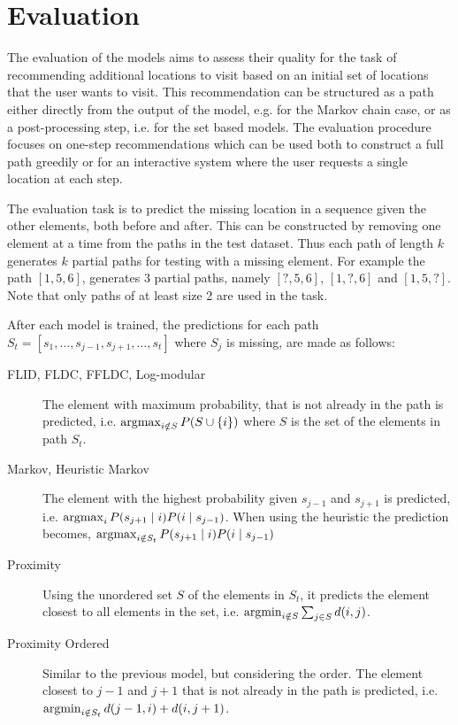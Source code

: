 \section{Evaluation}
\label{sec:evaluation}

The evaluation of the models aims to assess their quality for the task of recommending additional locations to visit based on an initial set of locations that the user wants to visit. This recommendation can be structured as a path either directly from the output of the model, e.g. for the Markov chain case, or as a post-processing step, i.e. for the set based models. The evaluation procedure focuses on one-step recommendations which can be used both to construct a full path greedily or for an interactive system where the user requests a single location at each step.

The evaluation task is to predict the missing location in a sequence given the other elements, both before and after. This can be constructed by removing one element at a time from the paths in the test dataset. Thus each path of length $k$ generates $k$ partial paths for testing with a missing element. For example the path $[1,5,6]$, generates 3 partial paths, namely $[?,5,6]$, $[1,?,6]$ and $[1,5,?]$. Note that only paths of at least size 2 are used in the task.

After each model is trained, the predictions for each path $S_{t} = [s_{1}, \dots, s_{j-1}, s_{j+1}, \dots, s_{t}]$ where $S_{j}$ is missing, are made as follows:

\begin{description}
  \item[FLID, FLDC, FFLDC, Log-modular] The element with maximum probability, that is not already in the path is predicted, i.e. $\operatorname*{argmax}_{i \notin S} P(S \cup \{i\})$ where $S$ is the set of the elements in path $S_{t}$.
  \item[Markov, Heuristic Markov] The element with the highest probability given $s_{j-1}$ and $s_{j+1}$ is predicted, i.e. $\operatorname*{argmax}_{i} P(s_{j+1} \mid i)P(i \mid s_{j-1})$. When using the heuristic the prediction becomes, $\operatorname*{argmax}_{i \notin S_{t}} P(s_{j+1} \mid i)P(i \mid s_{j-1})$
  \item[Proximity] Using the unordered set $S$ of the elements in $S_{t}$, it predicts the element closest to all elements in the set, i.e. $\operatorname*{argmin}_{i \notin S} \sum_{j \in S}d(i, j)$.
  \item[Proximity Ordered] Similar to the previous model, but considering the order. The element closest to $j-1$ and $j+1$ that is not already in the path is predicted, i.e. $\operatorname*{argmin}_{i \notin S_{t}}d(j-1, i) + d(i, j+1)$.
\end{description}

